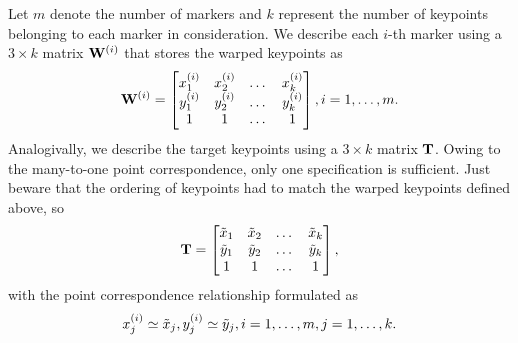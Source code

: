 Let $m$ denote the number of markers and $k$ represent the number of keypoints belonging to each marker in consideration. We describe each $i$-th marker using a $3 \times k$ matrix ${\mathbf{W}}^{\left( {i} \right)}$ that stores the warped keypoints as
\begin{equation}
    {\mathbf{W}}^{\left( {i} \right)} =
    \begin{bmatrix}
        {x}_{1}^{\left( {i} \right)} & {x}_{2}^{\left( {i} \right)} & \dots & {x}_{k}^{\left( {i} \right)} \\
        {y}_{1}^{\left( {i} \right)} & {y}_{2}^{\left( {i} \right)} & \dots & {y}_{k}^{\left( {i} \right)} \\
        1                         & 1                         & \dots & 1
    \end{bmatrix},
    i = 1, \dots, m.
\end{equation}
Analogivally, we describe the target keypoints using a $3 \times k$ matrix $\mathbf{T}$. Owing to the many-to-one point correspondence, only one specification is sufficient. Just beware that the ordering of keypoints had to match the warped keypoints defined above, so
\begin{equation}
    \mathbf{T} =
    \begin{bmatrix}
        \tilde{x}_1 & \tilde{x}_2 & \dots & \tilde{x}_k \\
        \tilde{y}_1 & \tilde{y}_2 & \dots & \tilde{y}_k \\
        1           & 1           & \dots & 1
    \end{bmatrix},
\end{equation}
with the point correspondence relationship formulated as
\begin{equation}
    {x}_{j}^{\left( {i} \right)} \simeq \tilde{x}_j, {y}_{j}^{\left( {i} \right)} \simeq \tilde{y}_j, i = 1, \dots, m, j = 1, \dots, k.
\end{equation}
